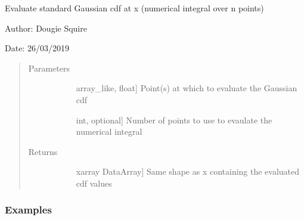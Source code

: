 \documentclass[letterpaper,10pt,english]{sphinxmanual}
\begin{document}
\begin{fulllineitems}
\label{\detokenize{utils_doc:utils.Gaussian_cdf}}
Evaluate standard Gaussian cdf at x (numerical integral over n points)

\begin{DUlineblock}{0em}
\item[] Author: Dougie Squire
\item[] Date: 26/03/2019
\end{DUlineblock}
\begin{quote}\begin{description}
\item[{Parameters}] \leavevmode\begin{description}
\item[{}] \leavevmode{[}array\_like, float{]}
Point(s) at which to evaluate the Gaussian cdf

\item[{}] \leavevmode{[}int, optional{]}
Number of points to use to evaulate the numerical integral

\end{description}

\item[{Returns}] \leavevmode\begin{description}
\item[{}] \leavevmode{[}xarray DataArray{]}
Same shape as x containing the evaluated cdf values

\end{description}

\end{description}\end{quote}
\subsubsection*{Examples}

\begin{sphinxVerbatim}[commandchars=\\\{\}]
\end{sphinxVerbatim}

\end{fulllineitems}
\end{document}
